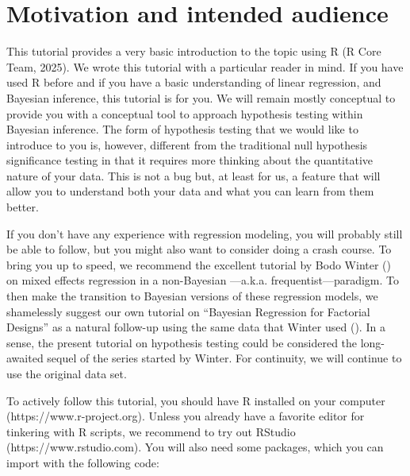 \documentclass[
  doc,
  floatsintext,
  longtable,
  nolmodern,
  notxfonts,
  notimes,
  colorlinks=true,linkcolor=blue,citecolor=blue,urlcolor=blue]{apa7}
\begin{document}
\section{Motivation and intended
audience}\label{motivation-and-intended-audience}

This tutorial provides a very basic introduction to the topic using R (R
Core Team, 2025). We wrote this tutorial with a particular reader in
mind. If you have used R before and if you have a basic understanding of
linear regression, and Bayesian inference, this tutorial is for you. We
will remain mostly conceptual to provide you with a conceptual tool to
approach hypothesis testing within Bayesian inference. The form of
hypothesis testing that we would like to introduce to you is, however,
different from the traditional null hypothesis significance testing in
that it requires more thinking about the quantitative nature of your
data. This is not a bug but, at least for us, a feature that will allow
you to understand both your data and what you can learn from them
better.

If you don't have any experience with regression modeling, you will
probably still be able to follow, but you might also want to consider
doing a crash course. To bring you up to speed, we recommend the
excellent tutorial by Bodo Winter
() on mixed eﬀects
regression in a non-Bayesian ---a.k.a. frequentist---paradigm. To then
make the transition to Bayesian versions of these regression models, we
shamelessly suggest our own tutorial on ``Bayesian Regression for
Factorial Designs'' as a natural follow-up using the same data that
Winter used
(). In a sense, the present tutorial on hypothesis testing
could be considered the long-awaited sequel of the series started by
Winter. For continuity, we will continue to use the original data set.

To actively follow this tutorial, you should have R installed on your
computer (https://www.r-project.org). Unless you already have a favorite
editor for tinkering with R scripts, we recommend to try out RStudio
(https://www.rstudio.com). You will also need some packages, which you
can import with the following code:
\end{document}
